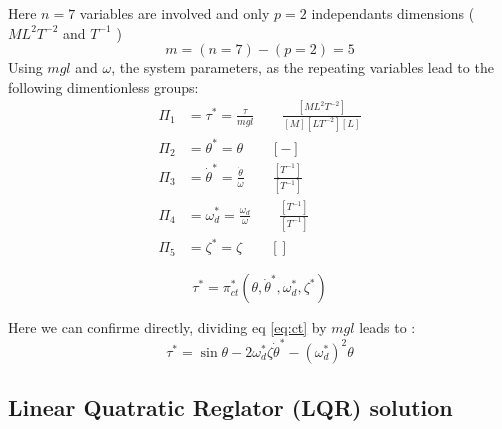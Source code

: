 Here $n=7$ variables are involved and only $p=2$ independants dimensions ( $ML^2T^{-2}$ and $T^{-1}$ )
\begin{equation}
m = (n = 7 ) - ( p = 2 ) = 5
\end{equation}
Using $mgl$ and $\omega$, the system parameters, as the repeating variables lead to the following dimentionless groups:
\begin{align}
\Pi_1 &= \tau^* = \frac{\tau}{mgl} \quad \quad \frac{[ML^2T^{-2}]}{[M][LT^{-2}][L]} \\
\Pi_2 &= \theta^* = \theta \quad \quad [-]\\
\Pi_3 &= \dot{\theta}^* = \frac{ \dot{\theta}  }{ \omega } \quad \quad \frac{[T^{-1}]}{[T^{-1}]} \\
\Pi_4 &= \omega_d^* = \frac{\omega_d}{\omega} \quad \quad \frac{[T^{-1}]}{[T^{-1}]} \\
\Pi_5 &= \zeta^* = \zeta \quad \quad []
\end{align}



\begin{equation}
\tau^*
=
\pi^*_{ct} \left(
\theta, \dot{\theta}^*,
\omega_d^* , \zeta^* 
\right)
\end{equation}

Here we can confirme directly, dividing eq \eqref{eq:ct} by $mgl$ leads to :
\begin{equation}
\tau^*
=
\sin \theta
- 2 \omega_d^* \zeta \dot{\theta}^* 
- (\omega_d^*)^2 \theta
\end{equation}




\newpage
\subsection{Linear Quatratic Reglator (LQR) solution}

